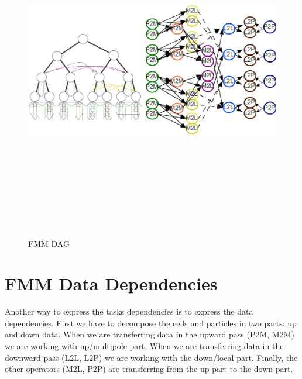 \documentclass[12pt,letterpaper,titlepage]{report}
\begin{document}
\begin{figure}[h!]
\begin{center}
\includegraphics[width=15cm, height=15cm, keepaspectratio=true]{dag.jpg}
\caption{FMM DAG}
\end{center}
\end{figure}
\section{FMM Data Dependencies}
Another way to express the tasks dependencies is to express the data dependencies.
First we have to decompose the cells and particles in two parts: up and down data.
When we are transferring data in the upward pass (P2M, M2M) we are working with up/multipole part.
When we are transferring data in the downward pass (L2L, L2P) we are working with the down/local part.
Finally, the other operators (M2L, P2P) are transferring from the up part to the down part.

\end{document}
